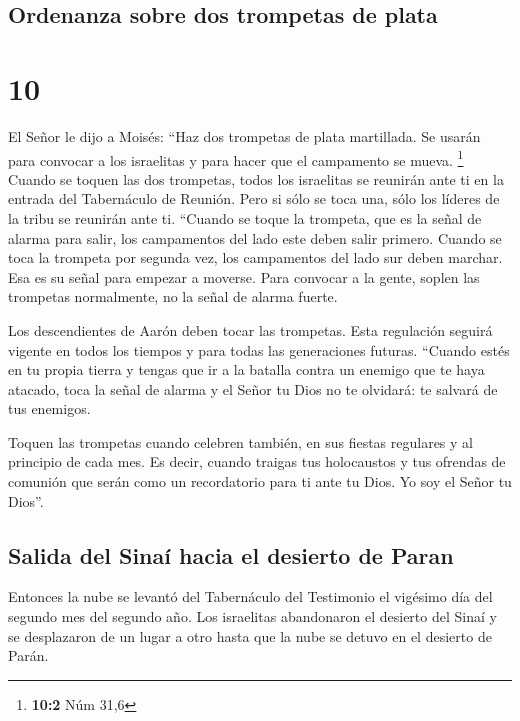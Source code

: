 \hypertarget{ordenanza-sobre-dos-trompetas-de-plata}{%
\subsection{Ordenanza sobre dos trompetas de
plata}\label{ordenanza-sobre-dos-trompetas-de-plata}}

\hypertarget{section-9}{%
\section{10}\label{section-9}}

 El Señor le dijo a Moisés:  ``Haz dos
trompetas de plata martillada. Se usarán para convocar a los israelitas
y para hacer que el campamento se mueva. \footnote{\textbf{10:2} Núm
  31,6}  Cuando se toquen las dos trompetas, todos los
israelitas se reunirán ante ti en la entrada del Tabernáculo de Reunión.
 Pero si sólo se toca una, sólo los líderes de la tribu se
reunirán ante ti.  ``Cuando se toque la trompeta, que es
la señal de alarma para salir, los campamentos del lado este deben salir
primero.  Cuando se toca la trompeta por segunda vez, los
campamentos del lado sur deben marchar. Esa es su señal para empezar a
moverse.  Para convocar a la gente, soplen las trompetas
normalmente, no la señal de alarma fuerte.

 Los descendientes de Aarón deben tocar las trompetas.
Esta regulación seguirá vigente en todos los tiempos y para todas las
generaciones futuras.  ``Cuando estés en tu propia tierra
y tengas que ir a la batalla contra un enemigo que te haya atacado, toca
la señal de alarma y el Señor tu Dios no te olvidará: te salvará de tus
enemigos.

 Toquen las trompetas cuando celebren también, en sus
fiestas regulares y al principio de cada mes. Es decir, cuando traigas
tus holocaustos y tus ofrendas de comunión que serán como un
recordatorio para ti ante tu Dios. Yo soy el Señor tu Dios''.

\hypertarget{salida-del-sinauxed-hacia-el-desierto-de-paran}{%
\subsection{Salida del Sinaí hacia el desierto de
Paran}\label{salida-del-sinauxed-hacia-el-desierto-de-paran}}

 Entonces la nube se levantó del Tabernáculo del
Testimonio el vigésimo día del segundo mes del segundo año.
 Los israelitas abandonaron el desierto del Sinaí y se
desplazaron de un lugar a otro hasta que la nube se detuvo en el
desierto de Parán.


